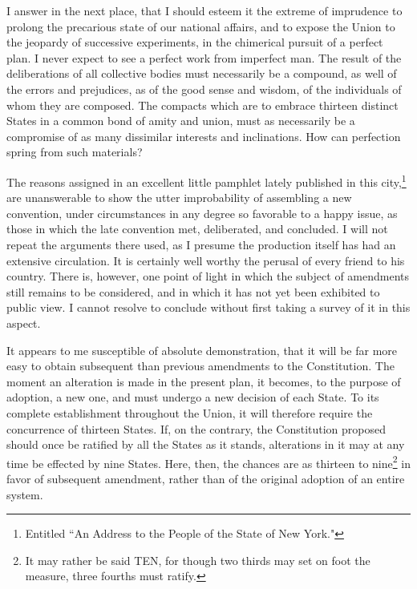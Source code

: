 I answer in the next place, that I should esteem it the extreme of imprudence to prolong the precarious state of our national affairs, and to expose the Union to the jeopardy of successive experiments, in the chimerical pursuit of a perfect plan. I never expect to see a perfect work from imperfect man. The result of the deliberations of all collective bodies must necessarily be a compound, as well of the errors and prejudices, as of the good sense and wisdom, of the individuals of whom they are composed. The compacts which are to embrace thirteen distinct States in a common bond of amity and union, must as necessarily be a compromise of as many dissimilar interests and inclinations. How can perfection spring from such materials?

The reasons assigned in an excellent little pamphlet lately published in this city,\footnote{Entitled ``An Address to the People of the State of New York."} are unanswerable to show the utter improbability of assembling a new convention, under circumstances in any degree so favorable to a happy issue, as those in which the late convention met, deliberated, and concluded. I will not repeat the arguments there used, as I presume the production itself has had an extensive circulation. It is certainly well worthy the perusal of every friend to his country. There is, however, one point of light in which the subject of amendments still remains to be considered, and in which it has not yet been exhibited to public view. I cannot resolve to conclude without first taking a survey of it in this aspect.

It appears to me susceptible of absolute demonstration, that it will be far more easy to obtain subsequent than previous amendments to the Constitution. The moment an alteration is made in the present plan, it becomes, to the purpose of adoption, a new one, and must undergo a new decision of each State. To its complete establishment throughout the Union, it will therefore require the concurrence of thirteen States. If, on the contrary, the Constitution proposed should once be ratified by all the States as it stands, alterations in it may at any time be effected by nine States. Here, then, the chances are as thirteen to nine\footnote{It may rather be said TEN, for though two thirds may set on foot the measure, three fourths must ratify.} in favor of subsequent amendment, rather than of the original adoption of an entire system.

